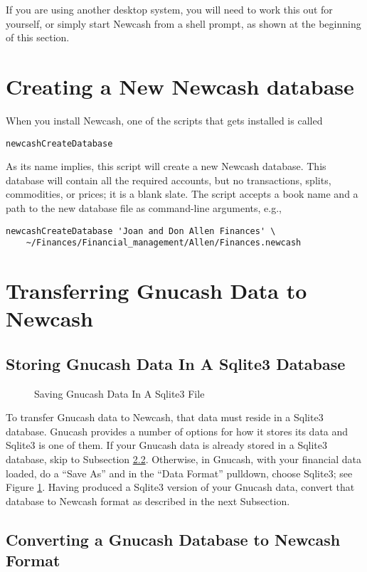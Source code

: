 \documentclass{report}
\newcommand{\graphicsfig}[5]{
\begin{figure}[#5]
\begin{center}
\resizebox{#1}{!}{\texttt{[image: \#2]}}
\end{center}
\caption{#3}
\label{#4}
\end{figure}
}
\begin{document}
If you are using another desktop system, you will need to work this out for yourself, or simply start Newcash from a shell prompt, as shown at the beginning of this section. 

\section{Creating a New Newcash database}
When you install Newcash, one of the scripts that gets installed is called 
\begin{verbatim}
newcashCreateDatabase
\end{verbatim}

As its name implies, this script will create a new Newcash database. This database will contain all the required accounts, but no transactions, splits, commodities, or prices; it is a blank slate. The script accepts a book name and a path to the new database file as command-line arguments, e.g.,
\begin{verbatim}
newcashCreateDatabase 'Joan and Don Allen Finances' \
	~/Finances/Financial_management/Allen/Finances.newcash
\end{verbatim}

\section{Transferring Gnucash Data to Newcash}
\subsection{Storing Gnucash Data In A Sqlite3 Database}
\graphicsfig{5in}{figures/gnucash_save_as.png}{Saving Gnucash Data In A Sqlite3 File}{Gnucash Save As}{}
To transfer Gnucash data to Newcash, that data must reside in a Sqlite3 database. Gnucash provides a number of options for how it stores its data and Sqlite3 is one of them. If your Gnucash data is already stored in a Sqlite3 database, skip to Subsection \ref{Converting a Gnucash Database to Newcash Format}. Otherwise, in Gnucash, with your financial data loaded, do a ``Save As'' and in the ``Data Format'' pulldown, choose Sqlite3; see Figure \ref{Gnucash Save As}. Having produced a Sqlite3 version of your Gnucash data, convert that database to Newcash format as described in the next Subsection. 
\subsection{Converting a Gnucash Database to Newcash Format}
\label{Converting a Gnucash Database to Newcash Format}
\end{document}
